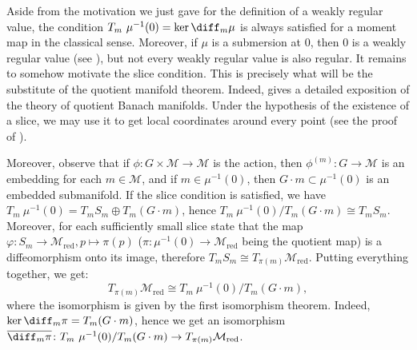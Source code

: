 Aside from the motivation we just gave for the definition of a weakly regular value, the condition \(T_m\ \mu^{-1}(0)=\ker \diff_m \mu\) is always satisfied for a moment map in the classical sense. Moreover, if \(\mu\) is a submersion at \(0\), then \(0\) is a weakly regular value (see \parencite[Th. 3.5.4]{alma994602424702061}), but not every weakly regular value is also regular. It remains to somehow motivate the slice condition. This is precisely what will be the substitute of the quotient manifold theorem. Indeed, \parencite[Sec. 3.5]{alma994602424702061} gives a detailed exposition of the theory of quotient Banach manifolds. Under the hypothesis of the existence of a slice, we may use it to get local coordinates around every point (see the proof of \parencite[Th. 3.5.25 and Lemma 3.5.26]{alma994602424702061}). 

Moreover, observe that if \(\phi\colon G \times \mathcal{M} \to \mathcal{M}\) is the action, then \(\phi^{(m)}\colon G \to \mathcal{M}\) is an embedding for each \(m \in \mathcal{M}\), and if \(m \in \mu^{-1}(0)\), then \(G\cdot m \subset \mu^{-1}(0)\) is an embedded submanifold. If the slice condition is satisfied, we have \( T_m \ \mu^{-1}(0)=T_mS_m\oplus T_m (G\cdot m)\), hence \(T_m\ \mu^{-1}(0)/T_m(G \cdot m)\cong T_mS_m\). Moreover, for each sufficiently small slice \parencite[Th. 3.5.25 and Lemma 3.5.26]{alma994602424702061} state that the map \(\varphi\colon S_m \to \mathcal{M}_{\mathrm{red}}, p \mapsto \pi(p)\) (\(\pi\colon \mu^{-1}(0)\to \mathcal{M}_{\mathrm{red}}\) being the quotient map) is a diffeomorphism onto its image, therefore \(T_mS_m \cong T_{\pi(m)} \mathcal{M}_{\mathrm{red}}\). Putting everything together, we get:
\begin{equation} \label{eq_tangent_to_reduced_M}
   T_{\pi(m)} \mathcal{M}_{\mathrm{red}} \cong T_m  \ \mu^{-1}(0)/T_m(G \cdot m), 
\end{equation}
where the isomorphism is given by the first isomorphism theorem. Indeed, \(\ker \diff_m \pi=T_m(G\cdot m)\), hence we get an isomorphism \(\overline{\diff_m \pi}\colon T_m \ \mu^{-1}(0)/T_m(G \cdot m)\to T_{\pi(m)}\mathcal{M}_{\mathrm{red}}\). 

